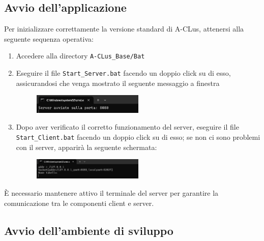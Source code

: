 \subsection*{Avvio dell'applicazione}

Per inizializzare correttamente la versione standard di A-CLus, attenersi alla seguente sequenza operativa:


\begin{enumerate}
    \item Accedere alla directory \texttt{A-CLus\_Base/Bat}
    \item Eseguire il file \texttt{Start\_Server.bat} facendo un doppio click su di esso, assicurandosi che venga mostrato il seguente messaggio a finestra
    
    \begin{figure}[h!]
        \centering
        \includegraphics[width=0.5\textwidth]{images/server in esecuzione.png}
    \end{figure}

    \item Dopo aver verificato il corretto funzionamento del server, eseguire il file \texttt{Start\_Client.bat} facendo un doppio click su di esso; se non ci sono problemi con il server, apparirà la seguente schermata:
    
    \begin{figure}[h!]
        \centering
        \includegraphics[width=0.5\textwidth]{images/client in esecuzione.png}
        
    \end{figure}
    
\end{enumerate}

\begin{tcolorbox}[colback=white, colframe=gray, title=Avvertenza]
    È necessario mantenere attivo il terminale del server per garantire la comunicazione tra le componenti client e server.
\end{tcolorbox}

\subsection*{Avvio dell'ambiente di sviluppo}

